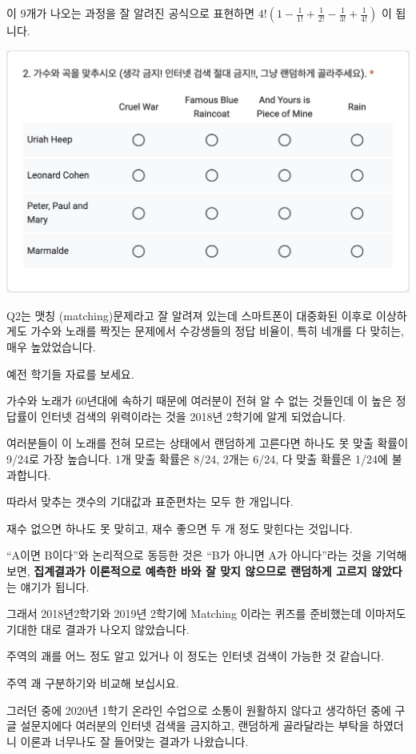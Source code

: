 \documentclass[
]{book}
\begin{document}
이 9개가 나오는 과정을 잘 알려진 공식으로 표현하면 \(4! \left( 1 - \frac{1}{1!} + \frac{1}{2!} - \frac{1}{3!} + \frac{1}{4!} \right)\) 이 됩니다.

\includegraphics[width=0.75\linewidth]{./pics/Quiz240524_Q2}

Q2는 맷칭 (matching)문제라고 잘 알려져 있는데 스마트폰이 대중화된 이후로 이상하게도 가수와 노래를 짝짓는 문제에서 수강생들의 정답 비율이, 특히 네개를 다 맞히는, 매우 높았었습니다.

예전 학기들 자료를 보세요.

가수와 노래가 60년대에 속하기 때문에 여러분이 전혀 알 수 없는 것들인데 이 높은 정답률이 인터넷 검색의 위력이라는 것을 2018년 2학기에 알게 되었습니다.

여러분들이 이 노래를 전혀 모르는 상태에서 랜덤하게 고른다면 하나도 못 맞출 확률이 9/24로 가장 높습니다.
1개 맞출 확률은 8/24, 2개는 6/24, 다 맞출 확률은 1/24에 불과합니다.

따라서 맞추는 갯수의 기대값과 표준편차는 모두 한 개입니다.

재수 없으면 하나도 못 맞히고, 재수 좋으면 두 개 정도 맞힌다는 것입니다.

``A이면 B이다''와 논리적으로 동등한 것은 ``B가 아니면 A가 아니다''라는 것을 기억해 보면, \textbf{집계결과가 이론적으로 예측한 바와 잘 맞지 않으므로 랜덤하게 고르지 않았다}는 얘기가 됩니다.

그래서 2018년2학기와 2019년 2학기에 Matching 이라는 퀴즈를 준비했는데 이마저도 기대한 대로 결과가 나오지 않았습니다.

주역의 괘를 어느 정도 알고 있거나 이 정도는 인터넷 검색이 가능한 것 같습니다.

주역 괘 구분하기와 비교해 보십시요.

그러던 중에 2020년 1학기 온라인 수업으로 소통이 원활하지 않다고 생각하던 중에 구글 설문지에다 여러분의 인터넷 검색을 금지하고, 랜덤하게 골라달라는 부탁을 하였더니 이론과 너무나도 잘 들어맞는 결과가 나왔습니다.
\end{document}
